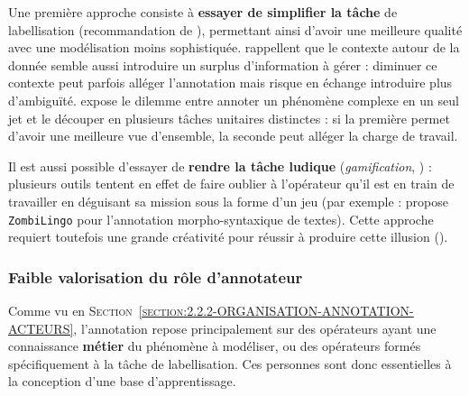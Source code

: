 			\begin{leftBarIdea}
				Une première approche consiste à \textbf{essayer de simplifier la tâche} de labellisation (recommandation de \cite{bayerl-paul:2011:what-determines-intercoder}), permettant ainsi d'avoir une meilleure qualité avec une modélisation moins sophistiquée.
				\cite{fort-etal:2012:modeling-complexity-manual} rappellent que le contexte autour de la donnée semble aussi introduire un surplus d'information à gérer : diminuer ce contexte peut parfois alléger l'annotation mais risque en échange introduire plus d'ambiguïté.
				\cite{baledent:2022:complexite-annotation-manuelle} expose le dilemme entre annoter un phénomène complexe en un seul jet et le découper en plusieurs tâches unitaires distinctes : si la première permet d'avoir une meilleure vue d'ensemble, la seconde peut alléger la charge de travail.
				
				Il est aussi possible d'essayer de \textbf{rendre la tâche ludique} (\textit{gamification}, \cite{von-ahn:2006:games-purpose}) : plusieurs outils tentent en effet de faire oublier à l'opérateur qu'il est en train de travailler en déguisant sa mission sous la forme d'un jeu (par exemple : \cite{guillaume-etal:2016:crowdsourcing-complex-language} propose \texttt{ZombiLingo} pour l'annotation morpho-syntaxique de textes).
				Cette approche requiert toutefois une grande créativité pour réussir à produire cette illusion (\cite{fort:2017:experts-ou-foule}).
			\end{leftBarIdea}
		
		
		\subsubsection{Faible valorisation du rôle d'annotateur}
		\label{section:2.3.3.C-DEFIS-ANNOTATION-ASPECT-HUMAIN-ESCLAVAGE}
			
			Comme vu en \textsc{Section~\ref{section:2.2.2-ORGANISATION-ANNOTATION-ACTEURS}}, l'annotation repose principalement sur des opérateurs ayant une connaissance \textbf{métier} du phénomène à modéliser, ou des opérateurs formés spécifiquement à la tâche de labellisation.
			Ces personnes sont donc essentielles à la conception d'une base d'apprentissage.
			
